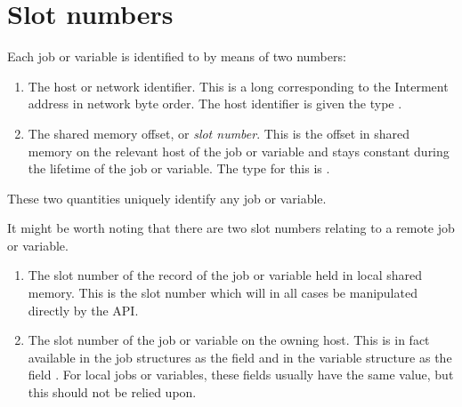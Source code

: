 \chapter{Slot numbers}
\label{chp:slot-numbers}
Each job or variable is identified to \textbf{\ProductName{}} by means of two
numbers:

\begin{enumerate}
\item The host or network identifier. This is a long corresponding to
the Interment address in network byte order. The host identifier is
given the type .
\item The shared memory offset, or \textit{slot number}. This is the
offset in shared memory on the relevant host of the job or variable and
stays constant during the lifetime of the job or variable. The type for
this is .
\end{enumerate}
These two quantities uniquely identify any job or variable.

It might be worth noting that there are two slot numbers relating to a
remote job or variable.

\begin{enumerate}
\item The slot number of the record of the job or variable held in local
shared memory. This is the slot number which will in all cases be
manipulated directly by the API.
\item The slot number of the job or variable on the owning host. This is
in fact available in the job structures as the field
 and in the variable structure as the
field . For local jobs or variables,
these fields usually have the same value, but this should not be relied
upon.
\end{enumerate}
